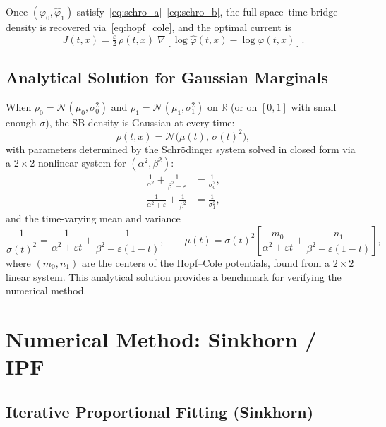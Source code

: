 \documentclass[11pt,a4paper]{article}
\newcommand{\eps}{\varepsilon}
\newcommand{\R}{\mathbb{R}}
\newcommand{\calN}{\mathcal{N}}
\begin{document}
Once $(\varphi_0, \hat\varphi_1)$ satisfy~\eqref{eq:schro_a}--\eqref{eq:schro_b},
the full space--time bridge density is recovered via~\eqref{eq:hopf_cole},
and the optimal current is
\begin{equation}
  J(t,x) = \tfrac\eps 2\,\rho(t,x)\;
    \nabla\!\left[\log\hat\varphi(t,x) - \log\varphi(t,x)\right].
\end{equation}

\subsection{Analytical Solution for Gaussian Marginals}

When $\rho_0 = \calN(\mu_0, \sigma_0^2)$ and $\rho_1 = \calN(\mu_1,\sigma_1^2)$
on $\R$ (or on $[0,1]$ with small enough $\sigma$), the SB density is
Gaussian at every time:
\begin{equation}
  \rho(t,x) = \calN\!\bigl(\mu(t),\,\sigma(t)^2\bigr),
\end{equation}
with parameters determined by the Schr\"{o}dinger system solved in closed form
via a $2\!\times\!2$ nonlinear system for $(\alpha^2, \beta^2)$:
\begin{align}
  \frac{1}{\alpha^2} + \frac{1}{\beta^2 + \eps} &= \frac{1}{\sigma_0^2},\\
  \frac{1}{\alpha^2 + \eps} + \frac{1}{\beta^2} &= \frac{1}{\sigma_1^2},
\end{align}
and the time-varying mean and variance
\begin{equation}
  \frac{1}{\sigma(t)^2} = \frac{1}{\alpha^2 + \eps t} + \frac{1}{\beta^2 + \eps(1-t)},
  \qquad
  \mu(t) = \sigma(t)^2\!\left[\frac{m_0}{\alpha^2+\eps t}
            + \frac{n_1}{\beta^2+\eps(1-t)}\right],
\end{equation}
where $(m_0, n_1)$ are the centers of the Hopf--Cole potentials, found from
a $2\!\times\!2$ linear system.
This analytical solution provides a benchmark for verifying the numerical
method.

\section{Numerical Method: Sinkhorn / IPF}\label{sec:sinkhorn}

\subsection{Iterative Proportional Fitting (Sinkhorn)}
\end{document}
